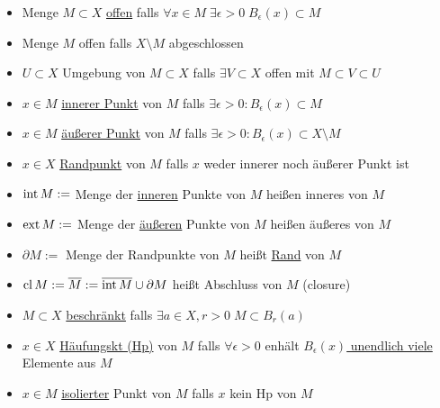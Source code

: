 \begin{mydefn}
    \begin{itemize}
    \item Menge $M\subset X$ \underline{offen} falls $\forall x \in M\;\exists \epsilon > 0\; B_{\epsilon}(x) \subset M$
    \item Menge $M$ offen falls $X\setminus M$ abgeschlossen
    \item $U \subset X$ Umgebung von $M \subset X$ falls $\exists V \subset X$ offen mit $M \subset V \subset U$
    \item $x \in M$ \underline{innerer Punkt} von $M$ falls $\exists \epsilon >0\colon B_{\epsilon}(x) \subset M$
    \item $x \in M$ \underline{äußerer Punkt} von $M$ falls $\exists \epsilon >0\colon B_{\epsilon}(x) \subset X\setminus M$
    \item $x \in X$ \underline{Randpunkt} von $M$ falls $x$ weder innerer noch äußerer Punkt ist
    \item $\operatorname{int} M:=$ Menge der \underline{inneren} Punkte von $M$ heißen inneres von $M$
    \item $\operatorname{ext} M:=$ Menge der \underline{äußeren} Punkte von $M$ heißen äußeres von $M$
    \item $\partial M:=$ Menge der Randpunkte von $M$ heißt \underline{Rand} von $M$
    \item $\operatorname{cl} M:= \overline{M}:=\overline{\operatorname{int} M} \cup \partial M$ heißt Abschluss von $M$ (closure)
    \item $M \subset X$ \underline{beschränkt} falls $\exists a \in X, r >0\; M \subset B_r(a)$
    \item $x \in X$ \underline{Häufungskt (Hp)} von $M$ falls $\forall \epsilon > 0$ enhält \underline{$B_{\epsilon}(x)$ unendlich viele} Elemente aus $M$
    \item $x \in M$ \underline{isolierter} Punkt von $M$ falls $x$ kein Hp von $M$
    \end{itemize}
\end{mydefn}

